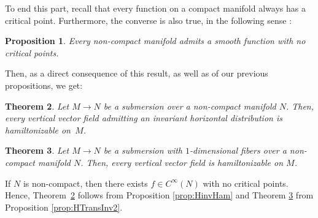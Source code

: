 \documentclass[pdftex]{sigma}%
\numberwithin{equation}{section}
\newtheorem{Theorem}{Theorem}[section]
\newtheorem{Proposition}[Theorem]{Proposition}
 { \theoremstyle{definition}
\newtheorem{Definition}[Theorem]{Definition}
\newtheorem{Note}[Theorem]{Note}
\newtheorem{Example}[Theorem]{Example}
\newtheorem{Remark}[Theorem]{Remark} }
\begin{document}
To end this part, recall that every function on a compact manifold always has a critical point. Furthermore, the converse is also true, in the following sense \cite[Theorem 4.8]{Hirsch-61}:

\begin{Proposition}\label{prop:NonCompReg}
Every non-compact manifold admits a smooth function with no critical points.
\end{Proposition}

Then, as a direct consequence of this result, as well as of our previous propositions, we get:

\begin{Theorem}\label{teo:HorInv}
Let $M \to N$ be a submersion over a non-compact manifold $N$. Then, every vertical vector field admitting an invariant horizontal distribution is hamiltonizable on~$M$.
\end{Theorem}

\begin{Theorem}\label{teo:VertHam}
Let $M{\to}N$ be a submersion with $1$-dimensional fibers over a non-compact manifold $N$. Then, every vertical vector field is hamiltonizable on $M$.
\end{Theorem}

If $N$ is non-compact, then there exists $f\in C^{\infty}(N)$ with no critical points. Hence, Theo\-rem~\ref{teo:HorInv} follows from Proposition \ref{prop:HinvHam} and Theorem \ref{teo:VertHam} from Proposition \ref{prop:HTransInv2}.
\end{document}
